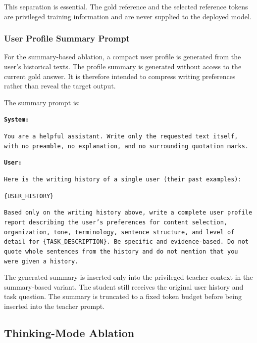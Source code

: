 \documentclass{article} %
\begin{document}
This separation is essential. The gold reference and the selected reference tokens are privileged training information and are never supplied to the deployed model.

\subsubsection{User Profile Summary Prompt}

For the summary-based ablation, a compact user profile is generated from the user's historical texts. The profile summary is generated without access to the current gold answer. It is therefore intended to compress writing preferences rather than reveal the target output.

The summary prompt is:

\begin{tcolorbox}[
    colback=gray!5,
    colframe=black!45,
    title=User profile summary prompt,
    breakable,
    left=3pt,
    right=3pt,
    top=3pt,
    bottom=3pt
]
\small
\texttt{\textbf{System:}}

\texttt{You are a helpful assistant. Write only the requested text itself, with no preamble, no explanation, and no surrounding quotation marks.}

\medskip

\texttt{\textbf{User:}}

\texttt{Here is the writing history of a single user (their past examples):}

\texttt{\{USER\_HISTORY\}}

\medskip

\texttt{Based only on the writing history above, write a complete user profile report describing the user's preferences for content selection, organization, tone, terminology, sentence structure, and level of detail for \{TASK\_DESCRIPTION\}. Be specific and evidence-based. Do not quote whole sentences from the history and do not mention that you were given a history.}
\end{tcolorbox}

The generated summary is inserted only into the privileged teacher context in the summary-based variant. The student still receives the original user history and task question. The summary is truncated to a fixed token budget before being inserted into the teacher prompt.


\subsection{Thinking-Mode Ablation}
\label{app:thinking_ablation}
\end{document}
